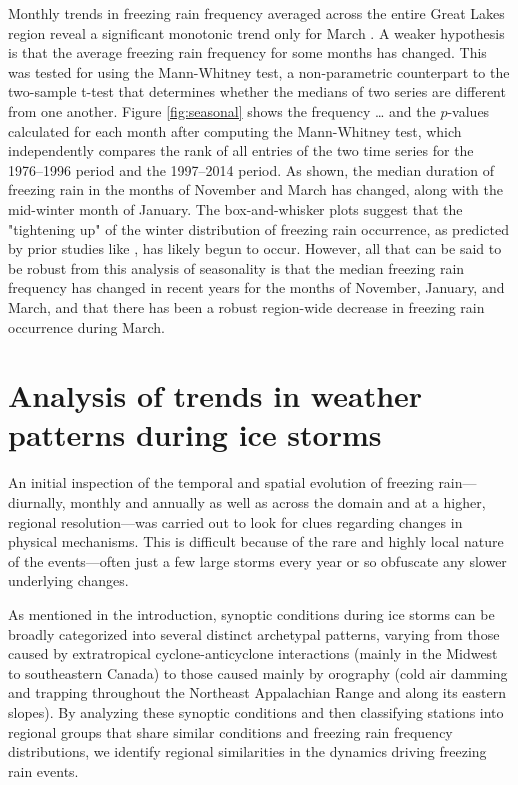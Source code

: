 \documentclass[twocol]{ametsoc}
\begin{document}
Monthly trends in freezing rain frequency averaged across the entire Great Lakes region reveal a significant monotonic trend only for March . A weaker hypothesis is that the average freezing rain frequency for some months has changed. This was tested for using the Mann-Whitney test, a non-parametric counterpart to the two-sample t-test that determines whether the medians of two series are different from one another. Figure \ref{fig:seasonal} shows the frequency … and the $p$-values calculated for each month after computing the Mann-Whitney test, which independently compares the rank of all entries of the two time series for the 1976--1996 period and the 1997--2014 period. As shown, the median duration of freezing rain in the months of November and March has changed, along with the mid-winter month of January. The box-and-whisker plots suggest that the "tightening up" of the winter distribution of freezing rain occurrence, as predicted by prior studies like \citet{cheng2011possible}, has likely begun to occur. However, all that can be said to be robust from this analysis of seasonality is that the median freezing rain frequency has changed in recent years for the months of November, January, and March, and that there has been a robust region-wide decrease in freezing rain occurrence during March.


\section{Analysis of trends in weather patterns during ice storms}
An initial inspection of the temporal and spatial evolution of freezing rain---diurnally, monthly and annually as well as across the domain and at a higher, regional resolution---was carried out to look for clues regarding changes in physical mechanisms.  This is difficult because of the rare and highly local nature of the events---often just a few large storms every year or so obfuscate any slower underlying changes.

As mentioned in the introduction, synoptic conditions during ice storms can be broadly categorized into several distinct archetypal patterns, varying from those caused by extratropical cyclone-anticyclone interactions (mainly in the Midwest to southeastern Canada) to those caused mainly by orography (cold air damming and trapping throughout the Northeast Appalachian Range and along its eastern slopes). By analyzing these synoptic conditions and then classifying stations into regional groups that share similar conditions and freezing rain frequency distributions, we identify regional similarities in the dynamics driving freezing rain events.
\end{document}
